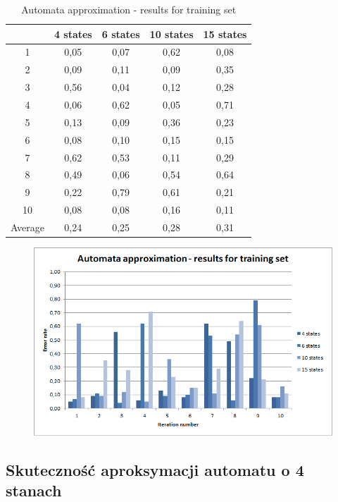 \documentclass[runningheads,a4paper]{llncs}
\begin{document}
\begin{table}[]
\centering
\caption{Automata approximation - results for training set}
\label{my-label}
\begin{tabular}{@{}ccccc@{}}
\toprule
        & 4 states & 6 states & 10 states & 15 states \\ \midrule
1       & 0,05     & 0,07     & 0,62      & 0,08      \\
2       & 0,09     & 0,11     & 0,09      & 0,35      \\
3       & 0,56     & 0,04     & 0,12      & 0,28      \\
4       & 0,06     & 0,62     & 0,05      & 0,71      \\
5       & 0,13     & 0,09     & 0,36      & 0,23      \\
6       & 0,08     & 0,10     & 0,15      & 0,15        \\
7       & 0,62     & 0,53     & 0,11      & 0,29        \\
8       & 0,49     & 0,06     & 0,54      & 0,64         \\
9       & 0,22     & 0,79     & 0,61      & 0,21     \\
10      & 0,08     & 0,08     & 0,16      & 0,11      \\
Average & 0,24     & 0,25     & 0,28      & 0,31      \\ \bottomrule
\end{tabular}
\end{table}

\begin{figure}
\centering
\includegraphics[scale=1]{6.png}
\end{figure}

\FloatBarrier
\subsection{Skuteczność aproksymacji automatu o 4 stanach}
\end{document}
